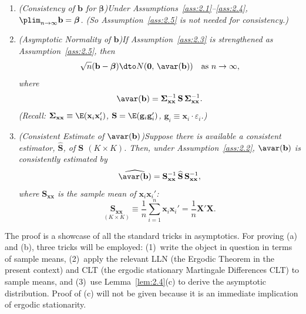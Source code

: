 \begin{proposition}
\label{prop:2.1}
\begin{enumerate}[label=(\alph*)]
  \item \emph{(Consistency of\/ $\mathbf{b}$ for $\bm{\beta}$)\quad Under
    Assumptions~\ref{ass:2.1}--\ref{ass:2.4},
    $\plim_{n \to \infty} \mathbf{b} = \bm{\beta}$.  (So Assumption~\ref{ass:2.5}
    is not needed for consistency.)}
  \item \emph{(Asymptotic Normality of\/ $\mathbf{b}$)\quad If
    Assumption~\ref{ass:2.3} is strengthened as Assumption~\ref{ass:2.5}, then}
    \[
      \sqrt{n}(\mathbf{b} - \bm{\beta}) \dto
      N(\mathbf{0},\, \avar(\mathbf{b}))
      \quad \text{as } n \to \infty,
    \]
    \emph{where}
    \begin{equation}
      \avar(\mathbf{b})
      = \bm{\Sigma}_{\mathbf{xx}}^{-1}\,\mathbf{S}\,
        \bm{\Sigma}_{\mathbf{xx}}^{-1}.
      \label{eq:2.3.4}
    \end{equation}
    \emph{(Recall: $\bm{\Sigma}_{\mathbf{xx}} \equiv \E(\mathbf{x}_i\mathbf{x}_i')$,
    $\mathbf{S} = \E(\mathbf{g}_i\mathbf{g}_i')$,
    $\mathbf{g}_i \equiv \mathbf{x}_i \cdot \varepsilon_i$.)}
  \item \emph{(Consistent Estimate of\/ $\avar(\mathbf{b})$)\quad Suppose there is
    available a consistent estimator, $\widehat{\mathbf{S}}$, of\/
    $\mathbf{S}$ $(K \times K)$.  Then, under Assumption~\ref{ass:2.2},
    $\avar(\mathbf{b})$ is consistently estimated by}
    \begin{equation}
      \widehat{\avar(\mathbf{b})}
      = \mathbf{S}_{\mathbf{xx}}^{-1}\,\widehat{\mathbf{S}}\,
        \mathbf{S}_{\mathbf{xx}}^{-1},
      \label{eq:2.3.5}
    \end{equation}
    \emph{where $\mathbf{S}_{\mathbf{xx}}$ is the sample mean of\/
    $\mathbf{x}_i\mathbf{x}_i'$:}
    \begin{equation}
      \underset{(K \times K)}{\mathbf{S}_{\mathbf{xx}}}
      \equiv \frac{1}{n} \sum_{i=1}^{n} \mathbf{x}_i\mathbf{x}_i'
      = \frac{1}{n}\mathbf{X}'\mathbf{X}.
      \label{eq:2.3.6}
    \end{equation}
\end{enumerate}
\end{proposition}

The proof is a showcase of all the standard tricks in asymptotics.  For proving (a)
and (b), three tricks will be employed: (1)~write the object in question in terms of
sample means, (2)~apply the relevant LLN (the Ergodic Theorem in the present
context) and CLT (the ergodic stationary Martingale Differences CLT) to sample
means, and (3)~use Lemma~\ref{lem:2.4}(c) to derive the asymptotic distribution.
Proof of (c) will not be given because it is an immediate implication of ergodic
stationarity.

